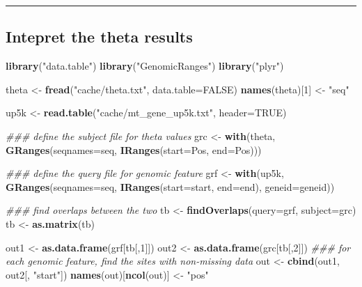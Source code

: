 \documentclass[]{article}
\newenvironment{Shaded}{\begin{snugshade}}{\end{snugshade}}
\newcommand{\CommentTok}[1]{\textcolor[rgb]{0.56,0.35,0.01}{\textit{#1}}}
\newcommand{\DataTypeTok}[1]{\textcolor[rgb]{0.13,0.29,0.53}{#1}}
\newcommand{\DecValTok}[1]{\textcolor[rgb]{0.00,0.00,0.81}{#1}}
\newcommand{\KeywordTok}[1]{\textcolor[rgb]{0.13,0.29,0.53}{\textbf{#1}}}
\newcommand{\NormalTok}[1]{#1}
\newcommand{\OtherTok}[1]{\textcolor[rgb]{0.56,0.35,0.01}{#1}}
\newcommand{\StringTok}[1]{\textcolor[rgb]{0.31,0.60,0.02}{#1}}
\begin{document}
\begin{center}\rule{0.5\linewidth}{0.5pt}\end{center}

\hypertarget{intepret-the-theta-results}{%
\subsection{Intepret the theta
results}\label{intepret-the-theta-results}}

\begin{Shaded}
\begin{Highlighting}[]
\KeywordTok{library}\NormalTok{(}\StringTok{"data.table"}\NormalTok{)}
\KeywordTok{library}\NormalTok{(}\StringTok{"GenomicRanges"}\NormalTok{)}
\KeywordTok{library}\NormalTok{(}\StringTok{"plyr"}\NormalTok{)}


\NormalTok{theta <-}\StringTok{ }\KeywordTok{fread}\NormalTok{(}\StringTok{"cache/theta.txt"}\NormalTok{, }\DataTypeTok{data.table=}\OtherTok{FALSE}\NormalTok{)}
\KeywordTok{names}\NormalTok{(theta)[}\DecValTok{1}\NormalTok{] <-}\StringTok{ "seq"}

\NormalTok{up5k <-}\StringTok{ }\KeywordTok{read.table}\NormalTok{(}\StringTok{"cache/mt_gene_up5k.txt"}\NormalTok{, }\DataTypeTok{header=}\OtherTok{TRUE}\NormalTok{)}

\CommentTok{### define the subject file for theta values}
\NormalTok{grc <-}\StringTok{ }\KeywordTok{with}\NormalTok{(theta, }\KeywordTok{GRanges}\NormalTok{(}\DataTypeTok{seqnames=}\NormalTok{seq, }\KeywordTok{IRanges}\NormalTok{(}\DataTypeTok{start=}\NormalTok{Pos, }\DataTypeTok{end=}\NormalTok{Pos)))}

\CommentTok{### define the query file for genomic feature}
\NormalTok{grf <-}\StringTok{ }\KeywordTok{with}\NormalTok{(up5k, }\KeywordTok{GRanges}\NormalTok{(}\DataTypeTok{seqnames=}\NormalTok{seq, }\KeywordTok{IRanges}\NormalTok{(}\DataTypeTok{start=}\NormalTok{start, }\DataTypeTok{end=}\NormalTok{end), }\DataTypeTok{geneid=}\NormalTok{geneid))}
    
\CommentTok{### find overlaps between the two}
\NormalTok{tb <-}\StringTok{ }\KeywordTok{findOverlaps}\NormalTok{(}\DataTypeTok{query=}\NormalTok{grf, }\DataTypeTok{subject=}\NormalTok{grc)}
\NormalTok{tb <-}\StringTok{ }\KeywordTok{as.matrix}\NormalTok{(tb)}
    
\NormalTok{out1 <-}\StringTok{ }\KeywordTok{as.data.frame}\NormalTok{(grf[tb[,}\DecValTok{1}\NormalTok{]])}
\NormalTok{out2 <-}\StringTok{ }\KeywordTok{as.data.frame}\NormalTok{(grc[tb[,}\DecValTok{2}\NormalTok{]])}
\CommentTok{### for each genomic feature, find the sites with non-missing data}
\NormalTok{out <-}\StringTok{ }\KeywordTok{cbind}\NormalTok{(out1, out2[, }\StringTok{"start"}\NormalTok{]) }
\KeywordTok{names}\NormalTok{(out)[}\KeywordTok{ncol}\NormalTok{(out)] <-}\StringTok{ "pos"}
\end{Highlighting}
\end{Shaded}
\end{document}
